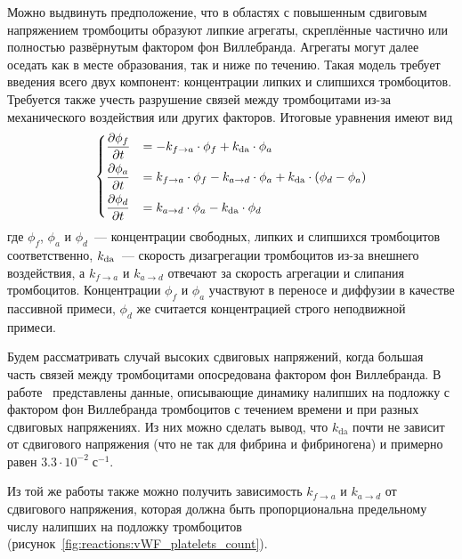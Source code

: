Можно выдвинуть предположение,
что в областях с повышенным сдвиговым напряжением тромбоциты образуют липкие агрегаты,
скреплённые частично или полностью развёрнутым фактором фон Виллебранда.
Агрегаты могут далее оседать как в месте образования, так и ниже по течению.
Такая модель требует введения всего двух компонент:
концентрации липких и слипшихся тромбоцитов.
Требуется также учесть разрушение связей между тромбоцитами из-за механического воздействия
или других факторов.
Итоговые уравнения имеют вид
%
\begin{equation}
    \label{eq:reactions:general_reactions_equations}
    \begin{dcases}
        \frac{\partial \phi_f}{\partial t} &= -k_{f \to a} \cdot \phi_f + k_{\textnormal{da}} \cdot \phi_a \\
        \frac{\partial \phi_a}{\partial t} &=  k_{f \to a} \cdot \phi_f - k_{a \to d} \cdot \phi_a + k_{\textnormal{da}} \cdot (\phi_d - \phi_a) \\
        \frac{\partial \phi_d}{\partial t} &=  k_{a \to d} \cdot \phi_a - k_{\textnormal{da}} \cdot \phi_d \\
    \end{dcases}
\end{equation}
%
где $ \phi_f $, $ \phi_a $ и $ \phi_d $~--- концентрации свободных, липких и слипшихся тромбоцитов соответственно,
$ k_\textnormal{da} $~--- скорость дизагрегации тромбоцитов из-за внешнего воздействия,
а $ k_{f \to a} $ и $ k_{a \to d} $ отвечают за скорость агрегации и слипания тромбоцитов.
Концентрации $ \phi_f $ и $ \phi_a $ участвуют в переносе и диффузии в качестве пассивной примеси,
$ \phi_d $ же считается концентрацией строго неподвижной примеси.

Будем рассматривать случай высоких сдвиговых напряжений,
когда большая часть связей между тромбоцитами опосредована фактором фон Виллебранда.
В работе~\cite{savage1996platelet_adhesion} представлены данные,
описывающие динамику налипших на подложку с фактором фон Виллебранда тромбоцитов
с течением времени и при разных сдвиговых напряжениях.
Из них можно сделать вывод, что $ k_\text{da} $ почти не зависит от сдвигового напряжения
(что не так для фибрина и фибриногена) и примерно равен $ 3.3 \cdot 10^{-2} \; \text{с}^{-1} $.

Из той же работы также можно получить зависимость $ k_{f \to a} $ и $ k_{a \to d} $ от сдвигового напряжения,
которая должна быть пропорциональна предельному числу налипших на подложку тромбоцитов
(рисунок~\ref{fig:reactions:vWF_platelets_count}).


